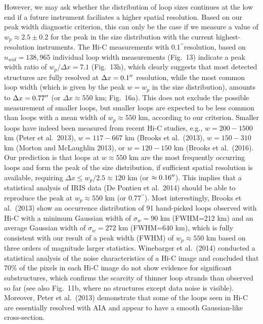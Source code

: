 \documentclass[10pt,preprint]{aastex}  %
\def\arcsec{\hbox{$^{\prime\prime}$}}
\begin{document}
However, we may ask whether the distribution
of loop sizes continues at the low end if a future instrument
faciliates a higher spatial resolution. Based on our peak width
diagnostic criterion, this can only be the case if we measure
a value of $w_p \approx 2.5\pm0.2$ for the peak in the size
distribution with the current highest-resolution instruments.
The Hi-C measurements with 0.1\arcsec resolution, based on 
$n_{wid}=138,965$ individual loop width measurements (Fig.~13) 
indicate a peak width ratio of $w_p/\Delta x=7.1$ (Fig.~13h), 
which clearly suggests that most detected structures are fully
resolved at $\Delta x=0.1\arcsec$ resolution, while the most
common loop width (which is given by the peak $w=w_p$ in the
size distribution), amounts to $\Delta x=0.77\arcsec$ (or
$\Delta x \approx 550$ km; Fig.~16a). This does not exclude the
possible measurement of smaller loops, but smaller loops 
are expected to be less common than loops with a mean width of
$w_p \approx 550$ km, according to our criterion. Smaller loops
have indeed been measured from recent Hi-C studies,
e.g., $w=200-1500$ km (Peter et al.~2013),
$w=117-667$ km (Brooks et al.~(2013),
$w=150-310$ km (Morton and McLaughlin 2013),
or $w=120-150$ km (Brooks et al.~(2016).
Our prediction is that loops at $w \approx 550$ km are the most
frequently occurring loops and form the peak of the size
distribution, if sufficient spatial resolution is available,
requiring $\Delta x \le w_p/2.5 \approx 120$ km (or $\approx 0.16\arcsec$).
This implies that a statistical analysis of IRIS data 
(De Pontieu et al.~2014) should be
able to reproduce the peak at $w_p \approx 550$ km (or 0.77\arcsec).
Most interestingly, Brooks et al.~(2013) show an occurrence
distribution of 91 hand-picked loops observed with Hi-C with a minimum
Gaussian width of $\sigma_w= 90$ km (FWHM=212 km) and an average 
Gaussian width of $\sigma_w=272$ km (FWHM=640 km),
which is fully consistent with our result of a peak 
width (FWHM) of $w_p\approx 550$ km based on three orders of magnitude
larger statistics. Winebarger et al.~(2014) conducted a 
statistical analysis of the noise characteristics of a Hi-C image
and concluded that 70\% of the pixels in each Hi-C image do not
show evidence for significant substructures, which confirms the
scarcity of thinner loop strands than observed so far (see also
Fig.~11b, where no structures except data noise is visible).
Moreover, Peter et al.~(2013) demonstrate that some of the loops 
seen in Hi-C are essentially resolved with AIA and appear to have 
a smooth Gaussian-like cross-section.
\end{document}
